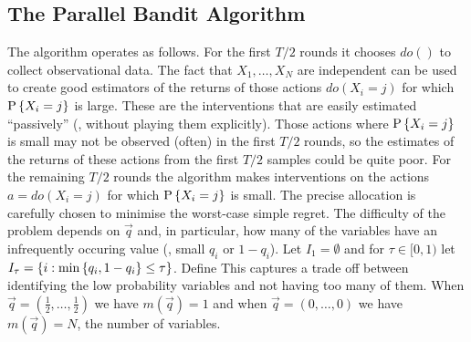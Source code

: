 


\subsection{The Parallel Bandit Algorithm}
\label{sub:par-bandit-alg}

The algorithm operates as follows. For the first $T/2$ rounds it chooses $do()$ to collect observational data.
The fact that $X_1,\ldots,X_N$ are independent can be used to create good estimators of the returns of those actions $do(X_i = j)$ for which $\P{X_i = j}$ is large. 
These are the interventions that are easily estimated ``passively'' (\ie, without playing them explicitly). 
Those actions where $\P{X_i = j}$ is small may not be observed (often) in the first $T/2$ rounds, so
the estimates of the returns of these actions from the first $T/2$ samples could be quite poor. For the remaining $T/2$ rounds
the algorithm makes interventions on the actions $a = do(X_i = j)$ for which $\P{X_i = j}$ is small. The precise allocation is
carefully chosen to minimise the worst-case simple regret. 
The difficulty of the problem depends on $\vec{q}$ and, in particular, how many of the variables have an infrequently occuring value (\ie, small $q_i$ or $1-q_i$). 
Let $I_1 = \emptyset$ and for $\tau \in [0,1)$ let $I_\tau = \set{ i : \min\set{q_i, 1-q_i} \leq \tau}$.
Define
This captures a trade off between identifying the low probability variables and not having too many of them.
When $\vec{q} = (\frac{1}{2}, \ldots, \frac{1}{2})$ we have $m(\vec{q}) = 1$ and when $\vec{q} = (0, \ldots, 0)$ we have $m(\vec{q}) = N$, the number of variables.

